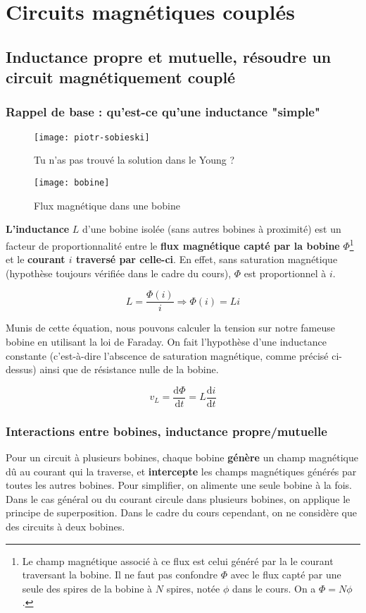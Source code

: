 \section{Circuits magnétiques couplés}
\subsection{Inductance propre et mutuelle, résoudre un circuit magnétiquement couplé}
\subsubsection*{Rappel de base : qu'est-ce qu'une inductance "simple"}
\begin{figure}[h]
	\centering
    \texttt{[image: piotr-sobieski]}
    \caption{\og Tu n'as pas trouvé la solution dans le Young ?\fg}
\end{figure}
\begin{figure}[h]
	\centering
    \texttt{[image: bobine]}
    \caption{Flux magnétique dans une bobine}
\end{figure}
\textbf{L'inductance} $L$ d'une bobine isolée (sans autres bobines à proximité) est un facteur de proportionnalité entre le \textbf{flux magnétique capté par la bobine} $\Phi$\footnote{Le champ magnétique associé à ce flux est celui généré par la le courant traversant la bobine. Il ne faut pas confondre $\Phi$ avec le flux capté par une seule des spires de la bobine à $N$ spires, notée $\phi$ dans le cours. On a $\Phi = N \phi$.} et le \textbf{courant $i$ traversé par celle-ci}. En effet, sans saturation magnétique (hypothèse toujours vérifiée dans le cadre du cours), $\Phi$ est proportionnel à $i$.

\begin{equation}
L = \frac{\Phi (i)}{i} \Longrightarrow \Phi(i) = Li
\end{equation}

Munis de cette équation, nous pouvons calculer la tension sur notre fameuse bobine en utilisant la loi de Faraday. On fait l'hypothèse d'une inductance constante (c'est-à-dire l'abscence de saturation magnétique, comme précisé ci-dessus) ainsi que de résistance nulle de la bobine.

\begin{equation}
v_L = \frac{\mathrm{d} \Phi}{\mathrm{d}t} = L \frac{\mathrm{d} i}{\mathrm{d}t}
\end{equation}
\subsubsection*{Interactions entre bobines, inductance propre/mutuelle}
Pour un circuit à plusieurs bobines, chaque bobine \textbf{génère} un champ magnétique dû au courant qui la traverse, et \textbf{intercepte} les champs magnétiques générés par toutes les autres bobines. Pour simplifier, on alimente une seule bobine à la fois. Dans le cas général ou du courant circule dans plusieurs bobines, on applique le principe de superposition. Dans le cadre du cours cependant, on ne considère que des circuits à deux bobines.

